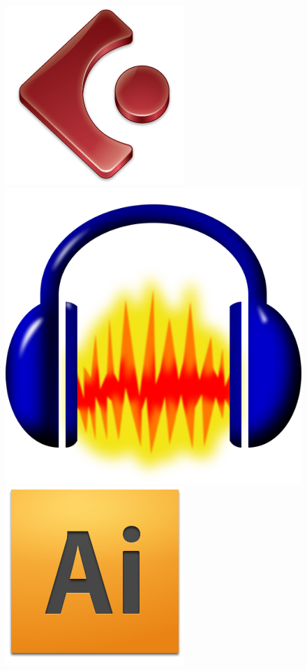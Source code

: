 \documentclass[11pt]{article} %
\begin{document}
\begin{figure}[tb]
\begin{center}
  \includegraphics[scale=0.3]{res/cubase-Logo.png} \quad
  \includegraphics[scale=0.04]{res/audacity.png} \quad
  \includegraphics[scale=0.3]{res/adobe_illustrator.png} \quad

\end{center}
\end{figure}
\end{document}
